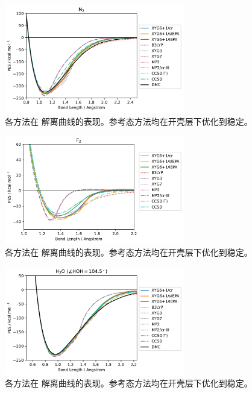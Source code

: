 \begin{figure}[!h]
  \centering
  \includegraphics[width=0.7\textwidth]{assets/curve-N2-stab.pdf}
  \caption[ 解离曲线表现 (开壳层)]{各方法在  解离曲线的表现。参考态方法均在开壳层下优化到稳定。}
  \label{fig.2.curve-N2-stab}
\end{figure}

\begin{figure}[!h]
  \centering
  \includegraphics[width=0.7\textwidth]{assets/curve-F2-stab.pdf}
  \caption[ 解离曲线表现 (开壳层)]{各方法在  解离曲线的表现。参考态方法均在开壳层下优化到稳定。}
  \label{fig.2.curve-F2-stab}
\end{figure}

\begin{figure}[!h]
  \centering
  \includegraphics[width=0.7\textwidth]{assets/curve-H2O-stab.pdf}
  \caption[ 解离曲线表现 (开壳层)]{各方法在  解离曲线的表现。参考态方法均在开壳层下优化到稳定。}
  \label{fig.2.curve-H2O-stab}
\end{figure}

